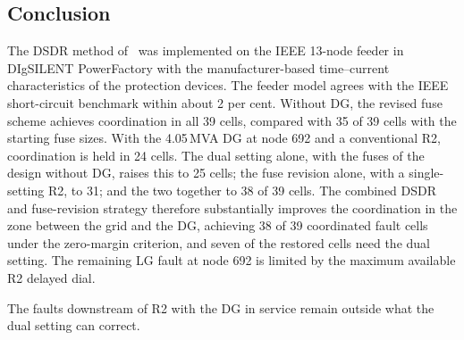 \documentclass[12pt,a4paper]{article}
\newcommand{\PF}{PowerFactory}
\begin{document}
\subsection{Conclusion}
The DSDR method of~\cite{yousaf2022} was implemented on the IEEE 13-node feeder in DIgSILENT \PF{} with
the manufacturer-based time--current characteristics of the protection devices. The feeder model agrees with the IEEE short-circuit
benchmark within about 2 per cent. Without DG, the revised fuse scheme achieves coordination in all
39 cells, compared with 35 of 39 cells with the starting fuse sizes. With the 4.05\,MVA DG at
node 692 and a conventional R2, coordination is held in 24 cells. The dual setting alone, with the
fuses of the design without DG, raises this to 25 cells; the fuse revision alone, with a single-setting R2,
to 31; and the two together to 38 of 39 cells. The combined DSDR and
fuse-revision strategy therefore substantially improves the coordination in the zone between the grid and
the DG, achieving 38 of 39 coordinated fault cells under the zero-margin criterion, and
seven of the restored cells need the dual setting. The remaining LG fault at node 692 is limited by the
maximum available R2 delayed dial.

The faults downstream of R2 with the DG in service remain outside what the dual setting can correct.
\end{document}
